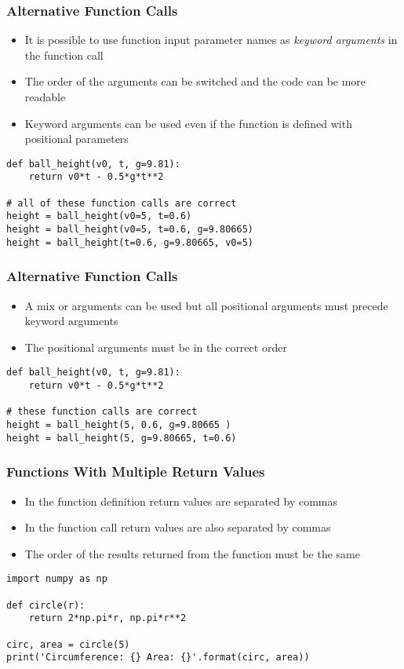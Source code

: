 \documentclass[english,14pt]{beamer}
\begin{document}
\begin{frame}[fragile]
\frametitle{Alternative Function Calls}
\begin{itemize}
\item It is possible to use function input parameter names as \textit{keyword arguments} in the function call
\item The order of the arguments can be switched and the code can be more readable
\item Keyword arguments can be used even if the function is defined with positional parameters
\end{itemize}
\begin{lstlisting}[style=CStyle]
def ball_height(v0, t, g=9.81):    
    return v0*t - 0.5*g*t**2      

# all of these function calls are correct
height = ball_height(v0=5, t=0.6)   
height = ball_height(v0=5, t=0.6, g=9.80665)  
height = ball_height(t=0.6, g=9.80665, v0=5) 
\end{lstlisting}
\end{frame}


\begin{frame}[fragile]
\frametitle{Alternative Function Calls}
\begin{itemize}
\item A mix or arguments can be used but all positional arguments must precede keyword arguments
\item The positional arguments must be in the correct order
\end{itemize}
\begin{lstlisting}[style=CStyle]
def ball_height(v0, t, g=9.81):    
    return v0*t - 0.5*g*t**2     
    
# these function calls are correct
height = ball_height(5, 0.6, g=9.80665 )   
height = ball_height(5, g=9.80665, t=0.6)  
\end{lstlisting}
\end{frame}




\begin{frame}[fragile]
\frametitle{Functions With Multiple Return Values}
\begin{itemize}
\item In the function definition return values are separated by commas 
\item In the function call return values are also separated by commas
\item The order of the results returned from the function must be the same
\end{itemize}
\begin{lstlisting}[style=CStyle]
import numpy as np

def circle(r):
    return 2*np.pi*r, np.pi*r**2

circ, area = circle(5)
print('Circumference: {} Area: {}'.format(circ, area)) 
\end{lstlisting}
\end{frame}
\end{document}
